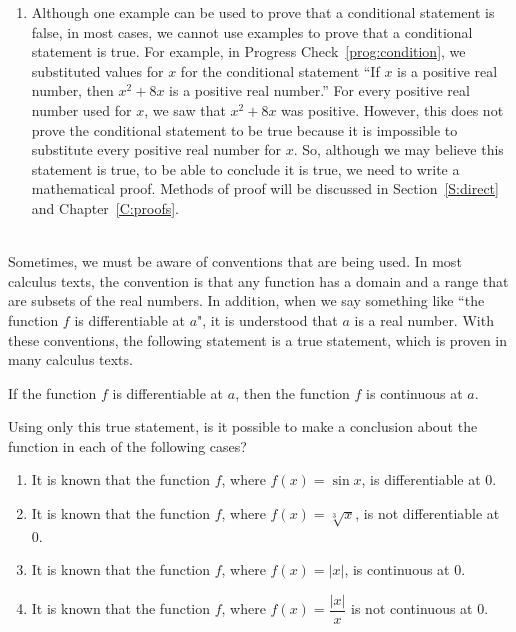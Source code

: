 \begin{enumerate}
\item Although one example can be used to prove that a conditional statement is false, in most cases, we cannot use examples to prove that a conditional statement is true.  For example, in Progress Check~\ref{prog:condition}, we substituted values for $x$ for the conditional statement ``If $x$ is a positive real number, then
\linebreak
$x^2 + 8x$ is a positive real number.''  For every positive real number used for $x$, we saw that $x^2 + 8x$ was positive.  However, this does not prove the conditional statement to be true because it is impossible to substitute every positive real number for $x$.  So, although we may believe this statement is true, to be able to conclude it is true, we need to write a mathematical proof.  Methods of proof will be discussed in Section~\ref{S:direct}  and Chapter~\ref{C:proofs}.
\end{enumerate}
\hbreak


\vskip6pt
\begin{prog}\label{pr:conditional} \hfill \\
Sometimes, we must be aware of conventions that are being used.  In most calculus texts, the convention is that any function has a domain and a range that are subsets  of the real numbers.  In addition, when we say something like ``the function $f$ is differentiable at $a$", it is understood that $a$ is a real number.  With these conventions, the following statement is a true statement, which is proven in many calculus texts.
\begin{center}
If the function  $f$  is differentiable at  $a$, then  the function   $f$  is continuous at  $a$.
\end{center}
\noindent
Using only this true statement, is it possible to make a conclusion about the function in each of the following cases?

\begin{enumerate}
\item It is known that the function  $f$, where   $f(x) = \sin x$, is differentiable at  0.
\item It is known that the function  $f$, where  $f(x) = \sqrt[3]{x}$, is not differentiable at  0.
\item It is known that the function  $f$, where   $f(x) = \left| x \right|$, is continuous at  0.
\item It is known that the function  $f$, where  $f(x) = \dfrac{{\left| x \right|}}{x}$ is not continuous at  0.
\end{enumerate}
\end{prog}
%
%
\hbreak


\endinput
